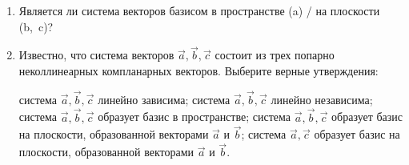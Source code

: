 \begin{enumerate}
    \item Является ли система векторов базисом в пространстве (a) / на плоскости (b,~c)?
    \begin{center}
    \end{center}
    \newpage
    \item Известно, что система векторов $\vec a, \vec b, \vec c$ состоит из трех попарно неколлинеарных компланарных векторов. Выберите верные утверждения:
    \begin{tasks}
        \task система $\vec a, \vec b, \vec c$ линейно зависима;
        \task система $\vec a, \vec b, \vec c$ линейно независима;
        \task система $\vec a, \vec b, \vec c$ образует базис в пространстве;
        \task система $\vec a, \vec b, \vec c$ образует базис на плоскости, образованной векторами $\vec a$ и $\vec b$;
        \task система $\vec a, \vec c$ образует базис на плоскости, образованной векторами $\vec a$ и $\vec b$.
    \end{tasks}
    

\end{enumerate}
